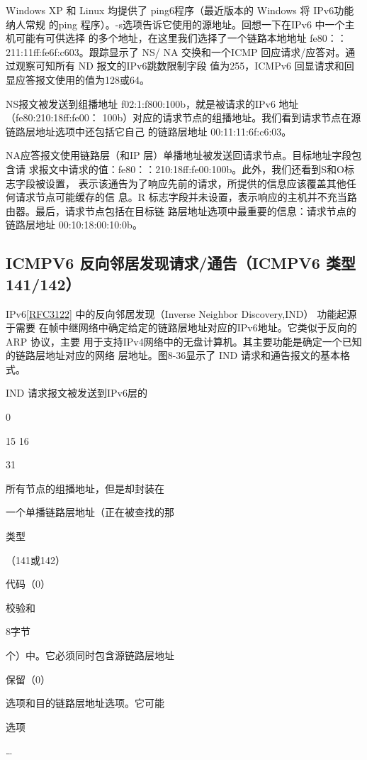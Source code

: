 Windows XP 和 Linux 均提供了 ping6程序（最近版本的 Windows 将 IPv6功能纳人常规
的ping 程序）。-s选项告诉它使用的源地址。回想一下在IPv6 中一个主机可能有可供选择
的多个地址，在这里我们选择了一个链路本地地址 fe80：：211:11ff:fe6f:c603。跟踪显示了 NS/
NA 交换和一个ICMP 回应请求/应答对。通过观察可知所有 ND 报文的IPv6跳数限制字段
值为255，ICMPv6 回显请求和回显应答报文使用的值为128或64。

NS报文被发送到组播地址 f02:1:f800:100b，就是被请求的IPv6 地址 （fe80:210:18ff:fe00：
100b）对应的请求节点的组播地址。我们看到请求节点在源链路层地址选项中还包括它自己
的链路层地址 00:11:11:6f:c6:03。

NA应答报文使用链路层（和IP 层）单播地址被发送回请求节点。目标地址字段包含请
求报文中请求的值：fe80：：210:18ff:fe00:100b。此外，我们还看到S和O标志字段被设置，
表示该通告为了响应先前的请求，所提供的信息应该覆盖其他任何请求节点可能缓存的信
息。R 标志字段并未设置，表示响应的主机并不充当路由器。最后，请求节点包括在目标链
路层地址选项中最重要的信息：请求节点的链路层地址 00:10:18:00:10:0b。

\subsection{ICMPV6 反向邻居发现请求/通告（ICMPV6 类型141/142）}

IPv6\href{https://www.rfc-editor.org/rfc/rfc3122}{[RFC3122]} 中的反向邻居发现（Inverse Neighbor Discovery,IND） 功能起源于需要
在帧中继网络中确定给定的链路层地址对应的IPv6地址。它类似于反向的ARP 协议，主要
用于支持IPv4网络中的无盘计算机。其主要功能是确定一个已知的链路层地址对应的网络
层地址。图8-36显示了 IND 请求和通告报文的基本格式。

IND 请求报文被发送到IPv6层的

0

15 16

31

所有节点的组播地址，但是却封装在

一个单播链路层地址（正在被查找的那

类型

（141或142）

代码（0）

校验和

8字节

个）中。它必须同时包含源链路层地址

保留（0）

选项和目的链路层地址选项。它可能

选项

…

